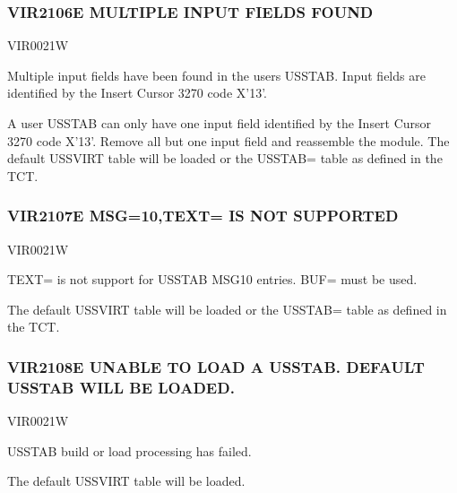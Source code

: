 \documentclass[letterpaper,10pt,english]{sphinxmanual}
\begin{document}
\subsubsection{VIR2106E MULTIPLE INPUT FIELDS FOUND}
\label{\detokenize{messages:vir2106e-multiple-input-fields-found}}\begin{description}
\sphinxAtStartPar
VIR0021W

\sphinxAtStartPar
Multiple input fields have been found in the users USSTAB. Input fields are identified by the Insert Cursor 3270 code X’13’.

\sphinxAtStartPar
A user USSTAB can only have one input field identified by the Insert Cursor 3270 code X’13’. Remove all but one input field and reassemble the module. The default USSVIRT table will be loaded or the USSTAB= table as defined in the TCT.

\end{description}


\subsubsection{VIR2107E MSG=10,TEXT= IS NOT SUPPORTED}
\label{\detokenize{messages:vir2107e-msg-10-text-is-not-supported}}\begin{description}
\sphinxAtStartPar
VIR0021W

\sphinxAtStartPar
TEXT= is not support for USSTAB MSG10 entries. BUF= must be used.

\sphinxAtStartPar
The default USSVIRT table will be loaded or the USSTAB= table as defined in the TCT.

\end{description}


\subsubsection{VIR2108E UNABLE TO LOAD A USSTAB. DEFAULT USSTAB WILL BE LOADED.}
\label{\detokenize{messages:vir2108e-unable-to-load-a-usstab-default-usstab-will-be-loaded}}\begin{description}
\sphinxAtStartPar
VIR0021W

\sphinxAtStartPar
USSTAB build or load processing has failed.

\sphinxAtStartPar
The default USSVIRT table will be loaded.

\end{description}
\end{document}
